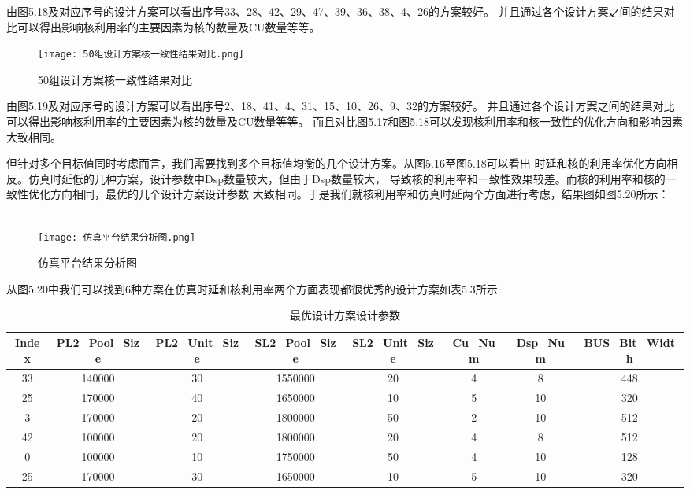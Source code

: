 由图5.18及对应序号的设计方案可以看出序号33、28、42、29、47、39、36、38、4、26的方案较好。
并且通过各个设计方案之间的结果对比可以得出影响核利用率的主要因素为核的数量及CU数量等等。

\begin{figure}[h]
    \centering
    \texttt{[image: 50组设计方案核一致性结果对比.png]}
    \caption{50组设计方案核一致性结果对比}
    \label{fig:badge}
\end{figure}

由图5.19及对应序号的设计方案可以看出序号2、18、41、4、31、15、10、26、9、32的方案较好。
并且通过各个设计方案之间的结果对比可以得出影响核利用率的主要因素为核的数量及CU数量等等。
而且对比图5.17和图5.18可以发现核利用率和核一致性的优化方向和影响因素大致相同。

但针对多个目标值同时考虑而言，我们需要找到多个目标值均衡的几个设计方案。从图5.16至图5.18可以看出
时延和核的利用率优化方向相反。仿真时延低的几种方案，设计参数中Dsp数量较大，但由于Dsp数量较大，
导致核的利用率和一致性效果较差。而核的利用率和核的一致性优化方向相同，最优的几个设计方案设计参数
大致相同。于是我们就核利用率和仿真时延两个方面进行考虑，结果图如图5.20所示：
\\
\\
\begin{figure}[h]
    \centering
    \texttt{[image: 仿真平台结果分析图.png]}
    \caption{仿真平台结果分析图}
    \label{fig:badge}
\end{figure}

从图5.20中我们可以找到6种方案在仿真时延和核利用率两个方面表现都很优秀的设计方案如表5.3所示:

\begin{table}[h]
    \centering\footnotesize
    \caption{最优设计方案设计参数}
    \begin{tabular}{|c|c|c|c|c|c|c|c|}
    \hline
    Index & PL2\_Pool\_Size & PL2\_Unit\_Size & SL2\_Pool\_Size & SL2\_Unit\_Size & Cu\_Num & Dsp\_Num & BUS\_Bit\_Width \\ \hline
    33    & 140000          & 30              & 1550000         & 20              & 4       & 8        & 448             \\ \hline
    25    & 170000          & 40              & 1650000         & 10              & 5       & 10       & 320             \\ \hline
    3     & 170000          & 20              & 1800000         & 50              & 2       & 10       & 512             \\ \hline
    42    & 100000          & 20              & 1800000         & 20              & 4       & 8        & 512             \\ \hline
    0     & 100000          & 10              & 1750000         & 50              & 4       & 10       & 128             \\ \hline
    25    & 170000          & 30              & 1650000         & 10              & 5       & 10       & 320             \\ \hline
    \end{tabular}
    \end{table}

